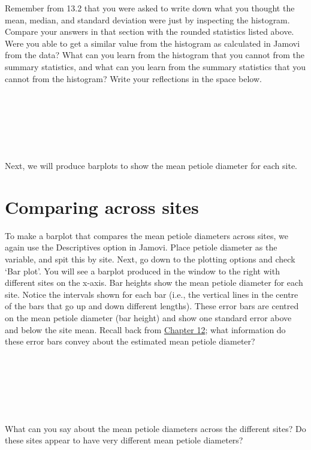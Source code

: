 \documentclass[
]{scrbook}
\begin{document}
Remember from 13.2 that you were asked to write down what you thought the mean, median, and standard deviation were just by inspecting the histogram.
Compare your answers in that section with the rounded statistics listed above.
Were you able to get a similar value from the histogram as calculated in Jamovi from the data?
What can you learn from the histogram that you cannot from the summary statistics, and what can you learn from the summary statistics that you cannot from the histogram?
Write your reflections in the space below.

\begin{verbatim}






\end{verbatim}

Next, we will produce barplots to show the mean petiole diameter for each site.

\hypertarget{comparing-across-sites}{%
\section{Comparing across sites}\label{comparing-across-sites}}

To make a barplot that compares the mean petiole diameters across sites, we again use the Descriptives option in Jamovi.
Place petiole diameter as the variable, and spit this by site.
Next, go down to the plotting options and check `Bar plot'.
You will see a barplot produced in the window to the right with different sites on the x-axis.
Bar heights show the mean petiole diameter for each site.
Notice the intervals shown for each bar (i.e., the vertical lines in the centre of the bars that go up and down different lengths).
These error bars are centred on the mean petiole diameter (bar height) and show one standard error above and below the site mean.
Recall back from \protect\hyperlink{Chapter_12}{Chapter 12}; what information do these error bars convey about the estimated mean petiole diameter?

\begin{verbatim}






\end{verbatim}

What can you say about the mean petiole diameters across the different sites?
Do these sites appear to have very different mean petiole diameters?

\begin{verbatim}






\end{verbatim}
\end{document}
